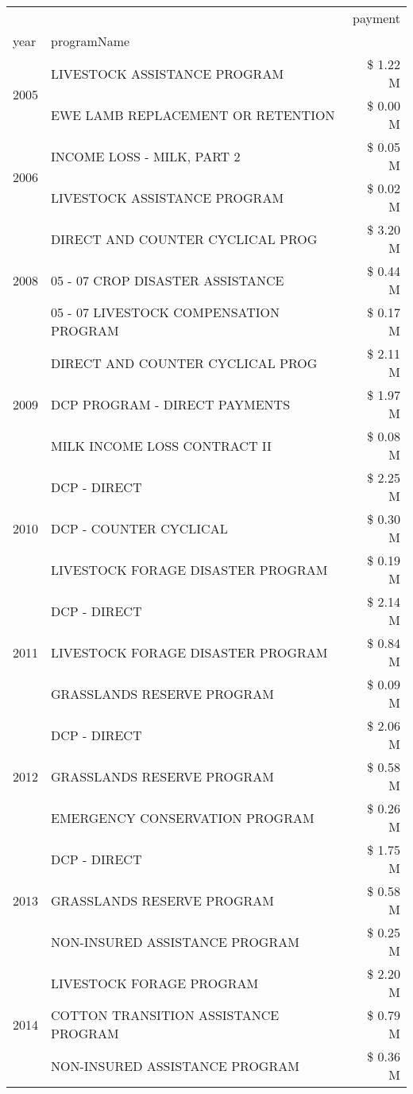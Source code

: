 \begin{tabular}{llr}
\toprule
 &  & payment \\
year & programName &  \\
\midrule
\multirow[t]{2}{*}{2005} & LIVESTOCK ASSISTANCE PROGRAM & \$ 1.22 M \\
 & EWE LAMB REPLACEMENT OR RETENTION & \$ 0.00 M \\
\cline{1-3}
\multirow[t]{2}{*}{2006} & INCOME LOSS - MILK, PART 2 & \$ 0.05 M \\
 & LIVESTOCK ASSISTANCE PROGRAM & \$ 0.02 M \\
\cline{1-3}
\multirow[t]{3}{*}{2008} & DIRECT AND COUNTER CYCLICAL PROG & \$ 3.20 M \\
 & 05 - 07 CROP DISASTER ASSISTANCE & \$ 0.44 M \\
 & 05 - 07 LIVESTOCK COMPENSATION PROGRAM & \$ 0.17 M \\
\cline{1-3}
\multirow[t]{3}{*}{2009} & DIRECT AND COUNTER CYCLICAL PROG & \$ 2.11 M \\
 & DCP PROGRAM - DIRECT PAYMENTS & \$ 1.97 M \\
 & MILK INCOME LOSS CONTRACT II & \$ 0.08 M \\
\cline{1-3}
\multirow[t]{3}{*}{2010} & DCP - DIRECT & \$ 2.25 M \\
 & DCP - COUNTER CYCLICAL & \$ 0.30 M \\
 & LIVESTOCK FORAGE DISASTER PROGRAM & \$ 0.19 M \\
\cline{1-3}
\multirow[t]{3}{*}{2011} & DCP - DIRECT & \$ 2.14 M \\
 & LIVESTOCK FORAGE DISASTER PROGRAM & \$ 0.84 M \\
 & GRASSLANDS RESERVE PROGRAM & \$ 0.09 M \\
\cline{1-3}
\multirow[t]{3}{*}{2012} & DCP - DIRECT & \$ 2.06 M \\
 & GRASSLANDS RESERVE PROGRAM & \$ 0.58 M \\
 & EMERGENCY CONSERVATION PROGRAM & \$ 0.26 M \\
\cline{1-3}
\multirow[t]{3}{*}{2013} & DCP - DIRECT & \$ 1.75 M \\
 & GRASSLANDS RESERVE PROGRAM & \$ 0.58 M \\
 & NON-INSURED ASSISTANCE PROGRAM & \$ 0.25 M \\
\cline{1-3}
\multirow[t]{3}{*}{2014} & LIVESTOCK FORAGE PROGRAM & \$ 2.20 M \\
 & COTTON TRANSITION ASSISTANCE PROGRAM & \$ 0.79 M \\
 & NON-INSURED ASSISTANCE PROGRAM & \$ 0.36 M \\

\end{tabular}
